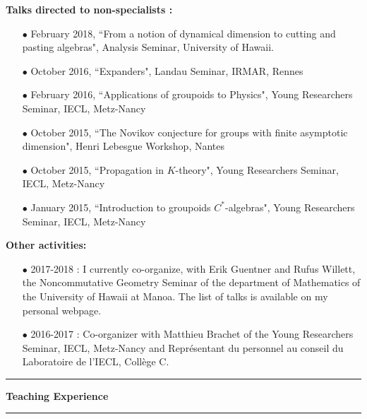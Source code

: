 \documentclass[a4paper,11pt]{article}
\newcommand\espace{\vrule height 20pt width 0pt}
\newcommand{\titre}[1]{%
	\begin{center}
	\bigskip
	\rule{\textwidth}{1pt}
	\par\vspace{0.1cm}
        \textbf{\large #1}
	\par\rule{\textwidth}{1pt}
	\end{center}
	\bigskip
	}
\begin{document}
\textbf{Talks directed to non-specialists :}\\

\begin{itemize}
\item[$\bullet$] February 2018, ``From a notion of dynamical dimension to cutting and pasting algebras", Analysis Seminar, University of Hawaii.
\item[$\bullet$] October 2016, ``Expanders", Landau Seminar, IRMAR, Rennes %
\item[$\bullet$] February 2016, ``Applications of groupoids to Physics", Young Researchers Seminar, IECL, Metz-Nancy
\item[$\bullet$] October 2015, ``The Novikov conjecture for groups with finite asymptotic dimension", Henri Lebesgue Workshop, Nantes
\item[$\bullet$] October 2015, ``Propagation in $K$-theory", Young Researchers Seminar, IECL, Metz-Nancy
\item[$\bullet$] January 2015, ``Introduction to groupoids $C^*$-algebras", Young Researchers Seminar, IECL, Metz-Nancy
\end{itemize}
\espace

\textbf{Other activities:} 
\begin{itemize}
\item[$\bullet$] 2017-2018 : I currently co-organize, with Erik Guentner and Rufus Willett, the Noncommutative Geometry Seminar of the department of Mathematics of the University of Hawaii at Manoa. The list of talks is available on my personal webpage.
\item[$\bullet$] 2016-2017 : Co-organizer with Matthieu Brachet of the Young Researchers Seminar, IECL, Metz-Nancy and Représentant du personnel au conseil du Laboratoire de l'IECL, Collège C.
\end{itemize}

\titre{Teaching Experience}
\end{document}

